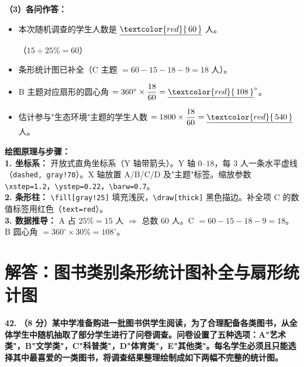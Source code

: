 \vspace{0.4cm}
\textbf{（3）各问作答：}

\begin{itemize}
    \item[\textbf{(1)}] 本次随机调查的学生人数是 $\underline{\textcolor{red}{\,60\,}}$ 人。

    （$15 \div 25\% = 60$）

    \item[\textbf{(2)}] 条形统计图已补全（C 主题 $= 60 - 15 - 18 - 9 = 18$ 人）。

    \item[\textbf{(3)}] B 主题对应扇形的圆心角 $= 360^\circ \times \dfrac{18}{60} = \underline{\textcolor{red}{\,108\,}}^\circ$。

    \item[\textbf{(4)}] 估计参与"生态环境"主题的学生人数 $= 1800 \times \dfrac{18}{60} = \underline{\textcolor{red}{\,540\,}}$ 人。
\end{itemize}

\vspace{0.4cm}
{\small\color{blue!70!black}
\textbf{绘图原理与步骤：}\\
\textbf{1. 坐标系：} 开放式直角坐标系（Y 轴带箭头）。Y 轴 $0$--$18$，每 $3$ 人一条水平虚线（\texttt{dashed, gray!70}）。X 轴放置 A/B/C/D 及"主题"标签。缩放参数 \texttt{\textbackslash{}xstep=1.2}，\texttt{\textbackslash{}ystep=0.22}，\texttt{\textbackslash{}barw=0.7}。\\
\textbf{2. 条形柱：} \texttt{\textbackslash{}fill[gray!25]} 填充浅灰，\texttt{\textbackslash{}draw[thick]} 黑色描边。补全项 C 的数值标签用红色（\texttt{text=red}）。\\
\textbf{3. 数据推导：} A 占 $25\% = 15$ 人 $\Rightarrow$ 总数 $60$ 人。C $= 60 - 15 - 18 - 9 = 18$。B 圆心角 $= 360^\circ \times 30\% = 108^\circ$。
}

\newpage



\section{解答：图书类别条形统计图补全与扇形统计图}

\vspace{0.6cm}

\textbf{\LARGE 42.} \textbf{（8 分）某中学准备购进一批图书供学生阅读，为了合理配备各类图书，从全体学生中随机抽取了部分学生进行了问卷调查。问卷设置了五种选项：A"艺术类"，B"文学类"，C"科普类"，D"体育类"，E"其他类"。每名学生必须且只能选择其中最喜爱的一类图书，将调查结果整理绘制成如下两幅不完整的统计图。}

